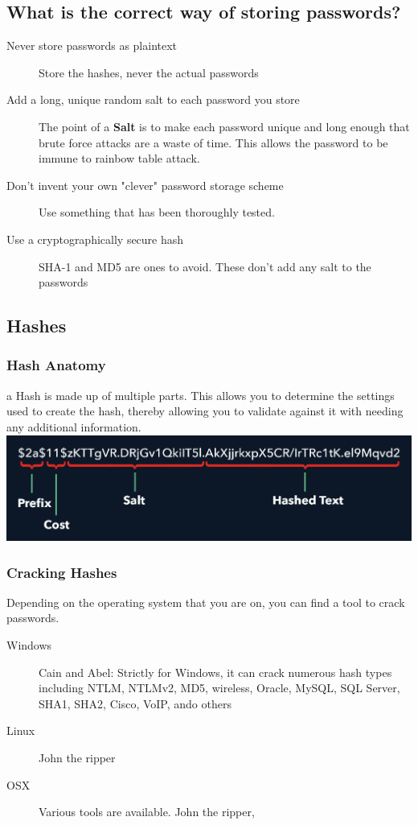 \documentclass[a4paper, titlepage]{article}
\begin{document}
\subsection{What is the correct way of storing passwords?}
\begin{description}
    \item [Never store passwords as plaintext] Store the hashes, never the actual passwords
    \item [Add a long, unique random salt to each password you store] The point of a \textbf{Salt} is to make each password unique and long enough that brute force attacks are a waste of time. This allows the password to be immune to rainbow table attack.
    \item [Don't invent your own "clever" password storage scheme] Use something that has been thoroughly tested.
    \item [Use a cryptographically secure hash] SHA-1 and MD5 are ones to avoid. These don't add any salt to the passwords
\end{description}

\subsection{Hashes}
\subsubsection{Hash Anatomy}
a Hash is made up of multiple parts. This allows you to determine the settings used to create the hash, thereby allowing you to validate against it with needing any additional information.
\newline
\newline
\includegraphics[width=\textwidth]{hash-anatomy}

\subsubsection{Cracking Hashes}
Depending on the operating system that you are on, you can find a tool to crack passwords.

\begin{description}
    \item[Windows] Cain and Abel: Strictly for Windows, it can crack numerous hash types including NTLM, NTLMv2, MD5, wireless, Oracle, MySQL, SQL Server, SHA1, SHA2, Cisco, VoIP, ando others
    \item[Linux] John the ripper
    \item[OSX] Various tools are available. John the ripper,
\end{description}
\end{document}
